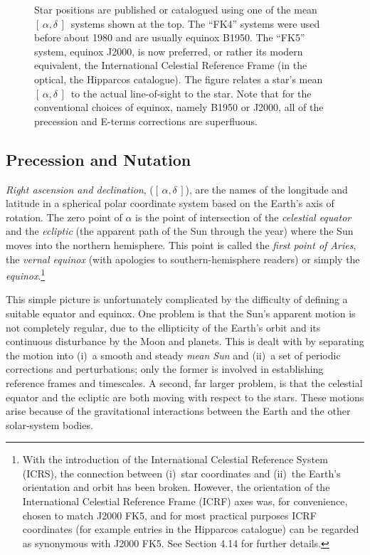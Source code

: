 \documentclass[11pt,twoside]{article}
\newcommand{\radec}     {$[\,\alpha,\delta\,]$}
\begin{document}
\begin{figure}
Star positions are published or catalogued using
one of the mean \radec\ systems shown at
the top.  The ``FK4'' systems
were used before about 1980 and are usually
equinox B1950.  The ``FK5'' system, equinox J2000, is now preferred,
or rather its modern equivalent, the International Celestial Reference
Frame (in the optical, the Hipparcos catalogue).
The figure relates a star's mean \radec\ to the actual
line-of-sight to the star.
Note that for the conventional choices of equinox, namely
B1950 or J2000, all of the precession and E-terms corrections
are superfluous.
\end{figure}

\subsection{Precession and Nutation}
{\it Right ascension and declination}, (\radec), are the names
of the longitude and latitude in a spherical
polar coordinate system based on the Earth's axis of rotation.
The zero point of $\alpha$ is the point of intersection of
the {\it celestial
equator}\/ and the {\it ecliptic}\/ (the apparent path of the Sun
through the year) where the Sun moves into the northern
hemisphere.  This point is called the
{\it first point of Aries},
the {\it vernal equinox}\/ (with apologies to
southern-hemisphere readers) or simply the {\it equinox}.\footnote{With
the introduction of the International Celestial Reference System (ICRS), the
connection between (i)~star coordinates and (ii)~the Earth's orientation
and orbit has been broken.  However, the orientation of the
International Celestial Reference Frame (ICRF) axes was, for convenience,
chosen to match J2000 FK5, and for most practical purposes ICRF coordinates
(for example entries in the Hipparcos catalogue) can be regarded as
synonymous with J2000 FK5.  See Section 4.14 for further details.}

This simple picture is unfortunately
complicated by the difficulty of defining
a suitable equator and equinox.  One problem is that the
Sun's apparent motion is not completely regular, due to the
ellipticity of the Earth's orbit and its continuous disturbance
by the Moon and planets.  This is dealt with by
separating the motion into (i)~a smooth and steady {\it mean Sun}\/
and (ii)~a set of periodic corrections and perturbations; only the former
is involved in establishing reference frames and timescales.
A second, far larger problem, is that
the celestial equator and the ecliptic
are both moving with respect to the stars.
These motions arise because of the gravitational
interactions between the Earth and the other solar-system bodies.
\end{document}
